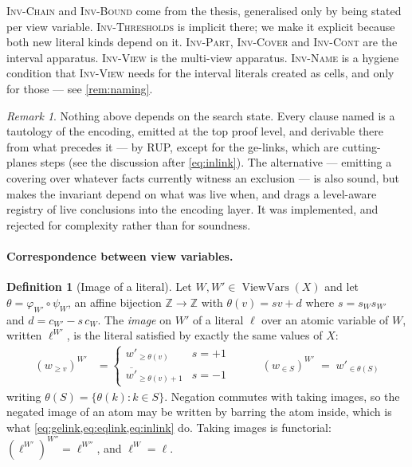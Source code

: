 \documentclass[11pt,a4paper]{article}
\theoremstyle{plain}
\theoremstyle{definition}
\newtheorem{definitionT}{Definition}
\theoremstyle{remark}
\newtheorem*{remark}{Remark}
\newcommand{\fname}[1]{\ensuremath{\operatorname{#1}}}
\newcommand{\ViewVars}{\fname{ViewVars}}
\newcommand{\atge}[2]{#1_{\geq #2}}
\newcommand{\natge}[2]{\overline{#1}_{\geq #2}}
\newcommand{\atset}[2]{#1_{\in #2}}
\newcommand{\inv}[1]{\textnormal{\textsc{Inv-#1}}}
\newcommand{\invChain}{\inv{Chain}}
\newcommand{\invThresholds}{\inv{Thresholds}}
\newcommand{\invPart}{\inv{Part}}
\newcommand{\invCover}{\inv{Cover}}
\newcommand{\invCont}{\inv{Cont}}
\newcommand{\invView}{\inv{View}}
\newcommand{\invName}{\inv{Name}}
\begin{document}
\invChain{} and \inv{Bound} come from the thesis, generalised only by being
stated per view variable.  \invThresholds{} is implicit there; we make it explicit
because both new literal kinds depend on it.  \invPart{}, \invCover{} and
\invCont{} are the interval apparatus.  \invView{} is the multi-view
apparatus.  \invName{} is a hygiene condition that \invView{} needs for the
interval literals created as cells, and only for those --- see
\cref{rem:naming}.

\begin{remark}
Nothing above depends on the search state.  Every clause named is a tautology of
the encoding, emitted at the top proof level, and derivable there from what
precedes it --- by RUP, except for the ge-links, which are cutting-planes steps
(see the discussion after \cref{eq:inlink}).  The alternative --- emitting a covering over whatever facts currently
witness an exclusion --- is also sound, but makes the invariant depend on what
was live when, and drags a level-aware registry of live conclusions into the
encoding layer.  It was implemented, and rejected for complexity rather than for
soundness.
\end{remark}

\paragraph{Correspondence between view variables.}

\begin{definitionT}[Image of a literal]
\label{def:image}
Let $W,W'\in\ViewVars(X)$ and let $\theta = \varphi_{W'}\circ\psi_W$, an affine
bijection $\mathbb Z\to\mathbb Z$ with $\theta(v) = s v + d$ where
$s = s_W s_{W'}$ and $d = c_{W'} - s\,c_W$.  The \emph{image} on $W'$ of a
literal $\ell$ over an atomic variable of $W$, written $\ell^{W'}$, is the
literal satisfied by exactly the same values of $X$:
\[
  \begin{array}{lll}
    (\atge{w}{v})^{W'} &=
      \begin{cases}
        \atge{w'}{\theta(v)} & s=+1\\[2pt]
        \natge{w'}{\theta(v)+1} & s=-1
      \end{cases}
    &\qquad
    (\atset{w}{S})^{W'} \;=\; \atset{w'}{\theta(S)}
  \end{array}
\]
writing $\theta(S) = \{\theta(k) : k\in S\}$.  Negation commutes with taking
images, so the negated image of an atom may be written by barring the atom
inside, which is what \cref{eq:gelink,eq:eqlink,eq:inlink} do.  Taking images is
functorial: $(\ell^{W'})^{W''} = \ell^{W''}$, and $\ell^{W}=\ell$.
\end{definitionT}
\end{document}
